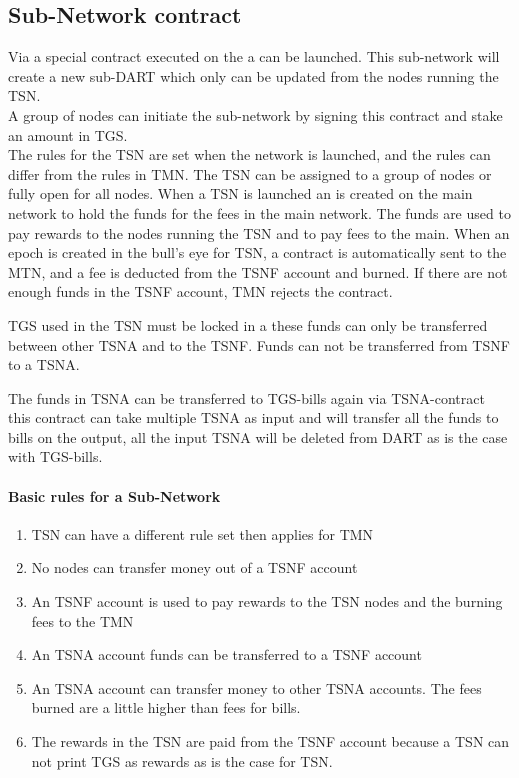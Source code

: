 \subsection{Sub-Network contract}

Via a special contract executed on the  a  can be launched. This sub-network will create a new sub-DART which only can be updated from the nodes running the TSN.\\
A group of nodes can initiate the sub-network by signing this contract and stake an amount in TGS.\\
The rules for the TSN are set when the network is launched, and the rules can differ from the rules in TMN.
The TSN can be assigned to a group of nodes or fully open for all nodes. When a TSN is launched an  is created on the main network to hold the funds for the fees in the main network. The funds are used to pay rewards to the nodes running the TSN and to pay fees to the main.
When an epoch is created in the bull's eye for TSN, a contract is automatically sent to the MTN, and a fee is deducted from the TSNF account and burned.
If there are not enough funds in the TSNF account, TMN rejects the contract.

TGS used in the TSN must be locked in a  these funds can only be transferred between other TSNA and to the TSNF. Funds can not be transferred from TSNF to a TSNA.

The funds in TSNA can be transferred to TGS-bills again via TSNA-contract this contract can take multiple TSNA as input and will transfer all the funds to bills on the output, all the input TSNA will be deleted from DART as is the case with TGS-bills.

\paragraph{Basic rules for a Sub-Network}
\begin{enumerate}[\S 1]
 \item TSN can have a different rule set then applies for TMN
 \item No nodes can transfer money out of a TSNF account
 \item An TSNF account is used to pay rewards to the TSN nodes and the burning fees to the TMN
 \item An TSNA account funds can be transferred to a TSNF account
 \item An TSNA account can transfer money to other TSNA accounts. The fees burned are a little higher than fees for bills.
 \item The rewards in the TSN are paid from the TSNF account because a TSN can not print TGS as rewards as is the case for TSN.
\end{enumerate}

